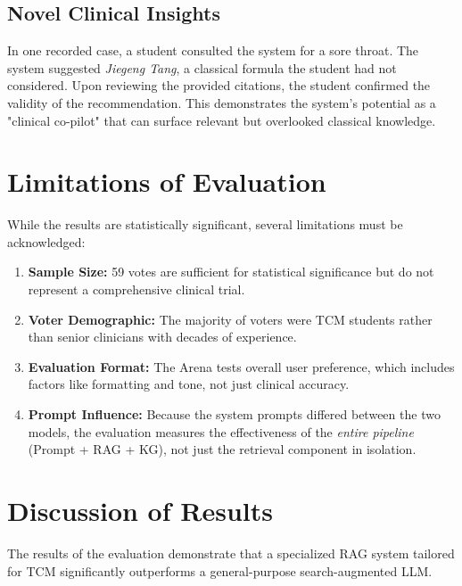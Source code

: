 \subsection{Novel Clinical Insights}
In one recorded case, a student consulted the system for a sore throat. The system suggested \textit{Jiegeng Tang}, a classical formula the student had not considered. Upon reviewing the provided citations, the student confirmed the validity of the recommendation. This demonstrates the system's potential as a "clinical co-pilot" that can surface relevant but overlooked classical knowledge.

\section{Limitations of Evaluation}

While the results are statistically significant, several limitations must be acknowledged:
\begin{enumerate}
    \item \textbf{Sample Size:} 59 votes are sufficient for statistical significance but do not represent a comprehensive clinical trial.
    \item \textbf{Voter Demographic:} The majority of voters were TCM students rather than senior clinicians with decades of experience.
    \item \textbf{Evaluation Format:} The Arena tests overall user preference, which includes factors like formatting and tone, not just clinical accuracy.
    \item \textbf{Prompt Influence:} Because the system prompts differed between the two models, the evaluation measures the effectiveness of the \textit{entire pipeline} (Prompt + RAG + KG), not just the retrieval component in isolation.
\end{enumerate}

\section{Discussion of Results}

The results of the evaluation demonstrate that a specialized RAG system tailored for TCM significantly outperforms a general-purpose search-augmented LLM.

